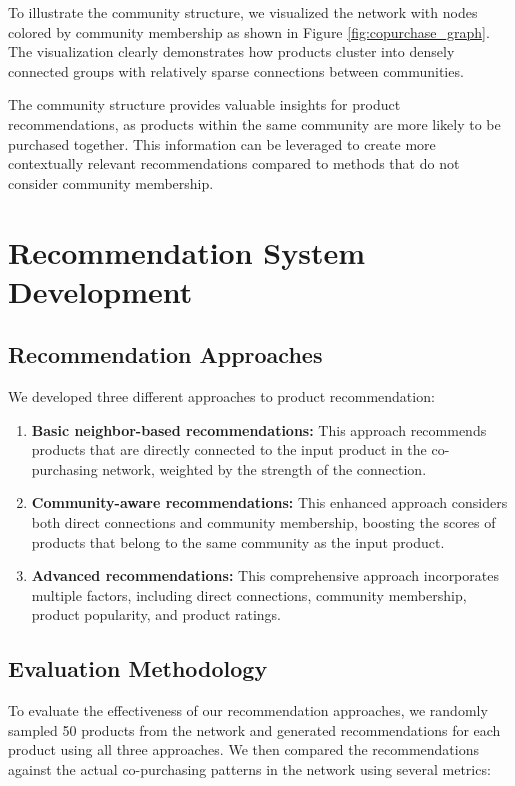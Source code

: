 \documentclass[conference]{IEEEtran}
\begin{document}
To illustrate the community structure, we visualized the network with nodes colored by community membership as shown in Figure \ref{fig:copurchase_graph}. The visualization clearly demonstrates how products cluster into densely connected groups with relatively sparse connections between communities.

The community structure provides valuable insights for product recommendations, as products within the same community are more likely to be purchased together. This information can be leveraged to create more contextually relevant recommendations compared to methods that do not consider community membership.

\section{Recommendation System Development}
\subsection{Recommendation Approaches}
We developed three different approaches to product recommendation:

\begin{enumerate}
    \item \textbf{Basic neighbor-based recommendations:} This approach recommends products that are directly connected to the input product in the co-purchasing network, weighted by the strength of the connection.
    
    \item \textbf{Community-aware recommendations:} This enhanced approach considers both direct connections and community membership, boosting the scores of products that belong to the same community as the input product.
    
    \item \textbf{Advanced recommendations:} This comprehensive approach incorporates multiple factors, including direct connections, community membership, product popularity, and product ratings.
\end{enumerate}

\subsection{Evaluation Methodology}
To evaluate the effectiveness of our recommendation approaches, we randomly sampled 50 products from the network and generated recommendations for each product using all three approaches. We then compared the recommendations against the actual co-purchasing patterns in the network using several metrics:
\end{document}
